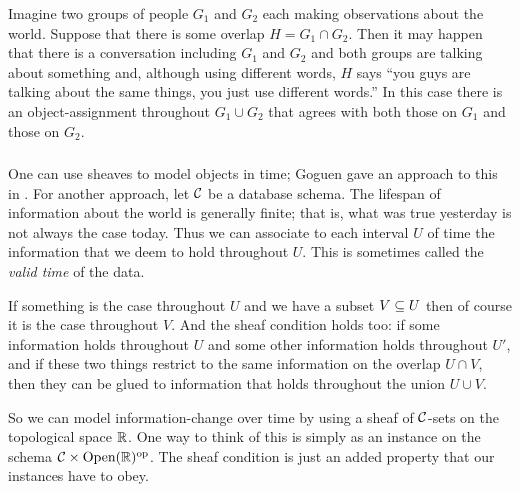 \documentclass[CT4S-EN-RU]{subfiles}
\begin{document}
\begin{example}

Imagine two groups of people $G_1$ and $G_2$ each making observations about the world. Suppose that there is some overlap $H=G_1\cap G_2$. Then it may happen that there is a conversation including $G_1$ and $G_2$ and both groups are talking about something and, although using different words, $H$ says “you guys are talking about the same things, you just use different words.” In this case there is an object-assignment throughout $G_1\cup G_2$ that agrees with both those on $G_1$ and those on $G_2$.

\end{example}


\subsubsection{}

One can use sheaves to model objects in time; Goguen gave an approach to this in \cite{Gog}. For another approach, let $\mcC$ be a database schema. The lifespan of information about the world is generally finite; that is, what was true yesterday is not always the case today. Thus we can associate to each interval $U$ of time the information that we deem to hold throughout $U$. This is sometimes called the {\em valid time} of the data.

If something is the case throughout $U$ and we have a subset $V\ss U$ then of course it is the case throughout $V$. And the sheaf condition holds too: if some information holds throughout $U$ and some other information holds throughout $U'$, and if these two things restrict to the same information on the overlap $U\cap V$, then they can be glued to information that holds throughout the union $U\cup V$.

So we can model information-change over time by using a sheaf of $\mcC$-sets on the topological space $\RR$. One way to think of this is simply as an instance on the schema $\mcC\times\Op(\RR)\op$. The sheaf condition is just an added property that our instances have to obey.
\end{document}
